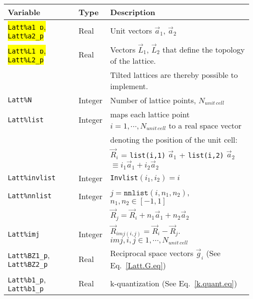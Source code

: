 \mycomment{

}
% 
%
\begin{table}[h]
   \begin{tabular}{l l l}
    Variable  & Type & Description \\\hline
     \hl{\texttt{Latt\%a1\_p}, \texttt{Latt\%a2\_p}}   & Real     & Unit vectors $\vec{a}_1$,  $\vec{a}_2$ \\ 
     \hl{\texttt{Latt\%L1\_p}, \texttt{Latt\%L2\_p}}   & Real     & Vectors $\vec{L}_1$, $\vec{L}_2$ that define the topology of the  lattice. \\
     									  &              &  Tilted lattices are  thereby possible to implement.  \\
    \texttt{Latt\%N}                                                 &   Integer &  Number of lattice points, $N_{unit\,cell}$   \\
    \texttt{Latt\%list}                                               & Integer &  maps each lattice point $i=1,\cdots, N_{unit\,cell}$ to a real space vector\\ 
                                                                             &   &  denoting the position of the unit cell: \\
                                                                             &   & $\vec{R}_i$ = \texttt{list(i,1)} $\vec{a}_1$ +  \texttt{list(i,2)} $\vec{a}_2$  $  \equiv i_1  \vec{a}_1 + i_2  \vec{a}_2 $ \\
    \texttt{Latt\%invlist}                                        &  Integer &   \texttt{Invlist}$(i_1,i_2) = i $ \\
    \texttt{Latt\%nnlist}                                         &  Integer &   $j = \texttt{nnlist} (i, n_1, n_2) $,  $n_1, n_2 \in [-1,1] $ \\
                                                                           &              &    $\vec{R}_j = \vec{R}_i + n_1 \vec{a}_1  + n_2 \vec{a}_2 $ \\
   \texttt{Latt\%imj}                                             &   Integer  &  $ \vec{R}_{imj(i,j)}  =  \vec{R}_i -  \vec{R}_j$.        $imj, i, j \in  1,\cdots, N_{unit\,cell}$\\
    \texttt{Latt\%BZ1\_p}, \texttt{Latt\%BZ2\_p}  &   Real     & Reciprocal space vectors $\vec{g}_i$   (See Eq.~\ref{Latt.G.eq})\\
    \texttt{Latt\%b1\_p}, \texttt{Latt\%b1\_p}       &   Real     &  k-quantization (See Eq.~\ref{k.quant.eq}) \\

\end{tabular}
\end{table}
